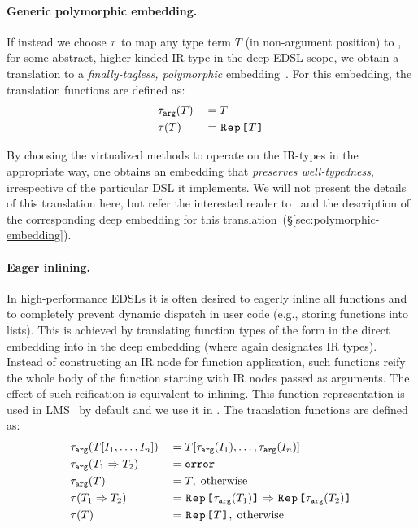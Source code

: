 \paragraph{Generic polymorphic embedding.} If instead we choose
$\ttother$ to map any type term $T$ (in non-argument position)
to , for some abstract, higher-kinded IR type
 in the deep EDSL scope, we obtain a translation to a
\emph{finally-tagless, polymorphic}
embedding~\cite{carette_finally_2009,hofer_polymorphic_2008}. For this
embedding, the translation functions are defined as:
\begin{alignat*}{2}
&\ttarg[T]   & \; = \; & T \\
&\ttother[T] & \; = \; & \text{\code{Rep[}} T \text{\code{]}}
\end{alignat*}

By choosing the virtualized methods to operate on the IR-types in the
appropriate way, one obtains an embedding that \emph{preserves
  well-typedness}, irrespective of the particular DSL it implements.
We will not present the details of this translation here, but refer
the interested reader to~\cite{carette_finally_2009} and the description of the
 corresponding deep embedding for this translation~(\S \ref{sec:polymorphic-embedding}).

\paragraph{Eager inlining.} In high-performance EDSLs it is often desired to
eagerly inline all functions and to completely prevent dynamic dispatch in
user code (e.g., storing functions into lists).  This is achieved by translating
function types of the form  in the direct embedding into
 in the deep embedding (where  again
designates IR types). Instead of constructing an IR node for function application, such functions reify the
whole body of the function starting with IR nodes passed as arguments. The effect of such
reification is equivalent to inlining. This function representation is used in LMS~\cite{rompf2012lightweight} by default
and we use it in . The translation functions are defined as:
\renewcommand*{\mathellipsis}{%
  \mathinner{{\ldotp}{\ldotp}{\ldotp}}%
}
\begin{alignat*}{3}
&\ttarg[T\lbrack I_1,\ldots,I_n \rbrack]   & \; = \; & T[\ttarg[I_1],\ldots,\ttarg[I_n]] \\
&\ttarg[T_1 \Rightarrow T_2] & \; = \; & \mathtt{error} \\
&\ttarg[T] & \; = \; & T, \; \text{otherwise} \\ %
&\ttother[T_1 \Rightarrow T_2] & \; = \; & \text{\code{Rep[}}\ttarg[T_1]\text{\code{]}} \Rightarrow \text{\code{Rep[}}\ttarg[T_2]\text{\code{]}}\\
&\ttother[T] & \; = \; & \text{\code{Rep[}} T \text{\code{]}},
\; \text{otherwise}
\end{alignat*} %

